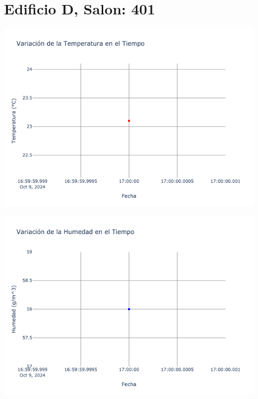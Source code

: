 \documentclass{article}
\begin{document}
    \section{Edificio D, Salon: 401}
    \noindent
    \begin{minipage}{0.48\textwidth}
        \centering
        \includegraphics[width=\textwidth]{../img/poli/TS401-90Dias-03-12-2024.png}
    \end{minipage}
    \hfill
    \begin{minipage}{0.48\textwidth}
        \centering
        \includegraphics[width=\textwidth]{../img/poli/HS401-90Dias-03-12-2024.png}
    \end{minipage}
\end{document}
